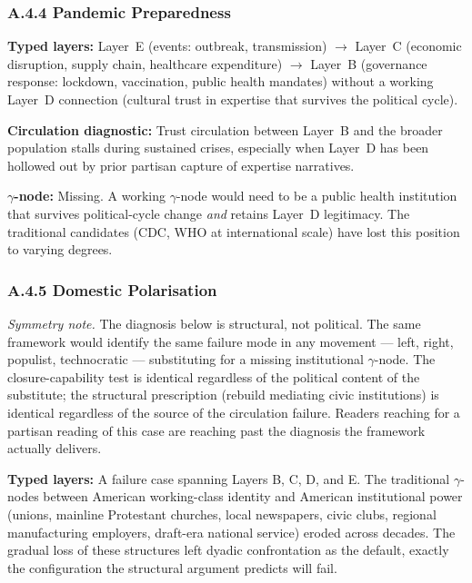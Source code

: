 \documentclass[
]{article}
\begin{document}
\subsubsection*{A.4.4 Pandemic Preparedness}

\textbf{Typed layers:} Layer~E (events: outbreak, transmission)
\(\to\) Layer~C (economic disruption, supply chain, healthcare
expenditure) \(\to\) Layer~B (governance response: lockdown,
vaccination, public health mandates) without a working Layer~D
connection (cultural trust in expertise that survives the political
cycle).

\textbf{Circulation diagnostic:} Trust circulation between Layer~B
and the broader population stalls during sustained crises, especially
when Layer~D has been hollowed out by prior partisan capture of
expertise narratives.

\textbf{\(\gamma\)-node:} Missing. A working \(\gamma\)-node would need
to be a public health institution that survives political-cycle change
\emph{and} retains Layer~D legitimacy. The traditional
candidates (CDC, WHO at international scale) have lost this position
to varying degrees.

\subsubsection*{A.4.5 Domestic Polarisation}

\emph{Symmetry note.} The diagnosis below is structural, not
political. The same framework would identify the same failure mode in
any movement --- left, right, populist, technocratic --- substituting
for a missing institutional \(\gamma\)-node. The closure-capability
test is identical regardless of the political content of the
substitute; the structural prescription (rebuild mediating civic
institutions) is identical regardless of the source of the
circulation failure. Readers reaching for a partisan reading of this
case are reaching past the diagnosis the framework actually delivers.

\textbf{Typed layers:} A failure case spanning Layers B, C, D, and E.
The traditional \(\gamma\)-nodes between American working-class
identity and American institutional power (unions, mainline Protestant
churches, local newspapers, civic clubs, regional manufacturing
employers, draft-era national service) eroded across decades. The
gradual loss of these structures left dyadic confrontation as the
default, exactly the configuration the structural argument predicts
will fail.
\end{document}
